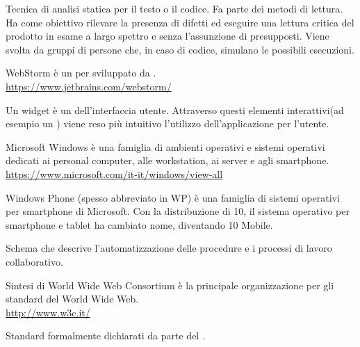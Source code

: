 Tecnica di analisi statica per il testo o il codice. Fa parte dei metodi di lettura. Ha come obiettivo rilevare la presenza di difetti ed eseguire una lettura critica del prodotto in esame a largo spettro e senza l’assunzione di presupposti. Viene svolta da gruppi di persone che, in caso di codice, simulano le possibili esecuzioni.

WebStorm è un  per  sviluppato da .\\
\url{https://www.jetbrains.com/webstorm/}

Un widget è un  dell'interfaccia utente. Attraverso questi elementi interattivi(ad esempio un ) viene reso più intuitivo l'utilizzo dell'applicazione per l'utente.

Microsoft Windows è una famiglia di ambienti operativi e sistemi operativi dedicati ai personal computer, alle workstation, ai server e agli smartphone.\\
\url{https://www.microsoft.com/it-it/windows/view-all}

Windows Phone (spesso abbreviato in WP) è una famiglia di sistemi operativi per smartphone di Microsoft. Con la distribuzione di  10, il sistema operativo per smartphone e tablet ha cambiato nome, diventando  10 Mobile.

Schema che descrive l’automatizzazione delle procedure e i processi di lavoro collaborativo.

Sintesi di World Wide Web Consortium \`e la principale organizzazione per gli standard del World Wide Web.\\
\url{http://www.w3c.it/}

Standard formalmente dichiarati da parte del .
\clearpage

